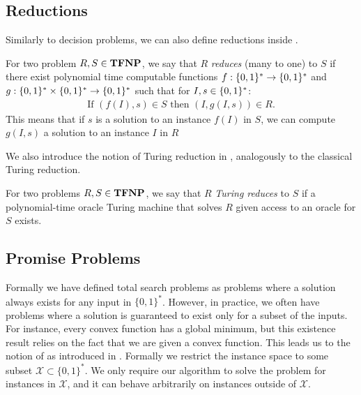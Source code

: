 \subsection{Reductions}

Similarly to decision problems, we can also define reductions inside \TFNP.

\begin{definition}
    For two problem $R, S \in \textbf{TFNP}$, we say that $R$ \emph{reduces} (many to one) to $S$ if there exist polynomial time computable functions $f : \{0, 1\}^* \rightarrow \{0, 1\}^*$ and $g : \{0, 1\}^* \times \{0, 1\}^* \rightarrow \{0, 1\}^*$ such that for $I, s \in \{0, 1\}^*$:
    \begin{align*}
        \text{If } (f(I), s) \in S \text{ then } (I, g(I, s)) \in R.
    \end{align*}
    This means that if $s$ is a solution to an instance $f(I)$ in $S$, we can compute $g(I, s)$ a solution to an instance $I$ in $R$
\end{definition}

We also introduce the notion of Turing reduction in \TFNP, analogously to the classical Turing reduction.

\begin{definition}
    For two problems $R, S \in \textbf{TFNP}$, we say that $R$ \emph{Turing reduces} to $S$ if a polynomial-time oracle Turing machine that solves $R$ given access to an oracle for $S$ exists.
\end{definition}

\subsection{Promise Problems}

Formally we have defined total search problems as problems where a solution always exists for any input in $\{0, 1\}^*$. However, in practice, we often have problems where a solution is guaranteed to exist only for a subset of the inputs. For instance, every convex function has a global minimum, but this existence result relies on the fact that we are given a convex function. This leads us to the notion of  as introduced in . Formally we restrict the instance space to some subset $\mathcal{X} \subset \{0, 1\}^*$. We only require our algorithm to solve the problem for instances in $\mathcal{X}$, and it can behave arbitrarily on instances outside of $\mathcal{X}$.

